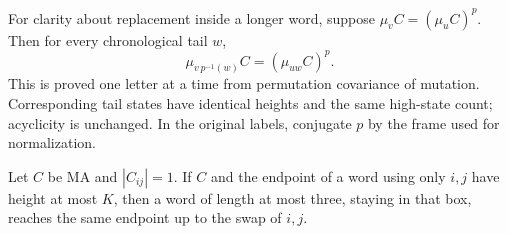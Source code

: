 For clarity about replacement inside a longer word, suppose $\mu_vC=(\mu_uC)^p$. Then for every chronological tail $w$,
\begin{equation}\label{eq:tailtransport}
 \mu_{v\,p^{-1}(w)}C=(\mu_{uw}C)^p.
\end{equation}
This is proved one letter at a time from permutation covariance of mutation. Corresponding tail states have identical heights and the same high-state count; acyclicity is unchanged. In the original labels, conjugate $p$ by the frame used for normalization.

\begin{lemma}\label{lem:unitroute}
Let $C$ be MA and $|C_{ij}|=1$. If $C$ and the endpoint of a word using only $i,j$ have height at most $K$, then a word of length at most three, staying in that box, reaches the same endpoint up to the swap of $i,j$.
\end{lemma}
